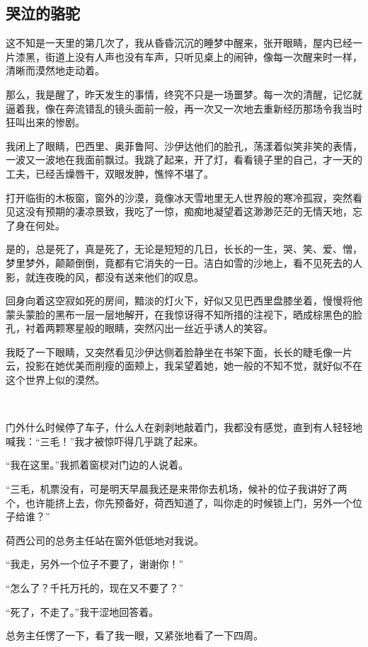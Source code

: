 \subsection{哭泣的骆驼}

\par 这不知是一天里的第几次了，我从昏昏沉沉的睡梦中醒来，张开眼睛，屋内已经一片漆黑，街道上没有人声也没有车声，只听见桌上的闹钟，像每一次醒来时一样，清晰而漠然地走动着。
\par 那么，我是醒了，昨天发生的事情，终究不只是一场噩梦。每一次的清醒，记忆就逼着我，像在奔流错乱的镜头面前一般，再一次又一次地去重新经历那场令我当时狂叫出来的惨剧。
\par 我闭上了眼睛，巴西里、奥菲鲁阿、沙伊达他们的脸孔，荡漾着似笑非笑的表情，一波又一波地在我面前飘过。我跳了起来，开了灯，看看镜子里的自己，才一天的工夫，已经舌燥唇干，双眼发肿，憔悴不堪了。
\par 打开临街的木板窗，窗外的沙漠，竟像冰天雪地里无人世界般的寒冷孤寂，突然看见这没有预期的凄凉景致，我吃了一惊，痴痴地凝望着这渺渺茫茫的无情天地，忘了身在何处。
\par 是的，总是死了，真是死了，无论是短短的几日，长长的一生，哭、笑、爱、憎，梦里梦外，颠颠倒倒，竟都有它消失的一日。洁白如雪的沙地上，看不见死去的人影，就连夜晚的风，都没有送来他们的叹息。
\par 回身向着这空寂如死的房间，黯淡的灯火下，好似又见巴西里盘膝坐着，慢慢将他蒙头蒙脸的黑布一层一层地解开，在我惊讶得不知所措的注视下，晒成棕黑色的脸孔，衬着两颗寒星般的眼睛，突然闪出一丝近乎诱人的笑容。
\par 我眨了一下眼睛，又突然看见沙伊达侧着脸静坐在书架下面，长长的睫毛像一片云，投影在她优美而削瘦的面颊上，我呆望着她，她一般的不知不觉，就好似不在这个世界上似的漠然。
\par  
\par 门外什么时候停了车子，什么人在剥剥地敲着门，我都没有感觉，直到有人轻轻地喊我：“三毛！”我才被惊吓得几乎跳了起来。
\par “我在这里。”我抓着窗棂对门边的人说着。
\par “三毛，机票没有，可是明天早晨我还是来带你去机场，候补的位子我讲好了两个，也许能挤上去，你先预备好，荷西知道了，叫你走的时候锁上门，另外一个位子给谁？”
\par 荷西公司的总务主任站在窗外低低地对我说。
\par “我走，另外一个位子不要了，谢谢你！”
\par “怎么了？千托万托的，现在又不要了？”
\par “死了，不走了。”我干涩地回答着。
\par 总务主任愣了一下，看了我一眼，又紧张地看了一下四周。
